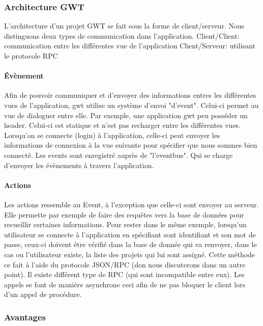 \subsubsection{Architecture GWT}
L'architecture d'un projet GWT se fait sous la forme de client/serveur. Nous distinguons deux types de communication dans l'application.
Client/Client: communication entre les différentes vue de l'application
Client/Serveur: utilisant le protocole RPC 

\paragraph{Évènement}
Afin de pouvoir communiquer et d'envoyer des informations entres les différentes vues de l'application, gwt utilise un système d'envoi "d'event". Celui-ci permet au vue de dialoguer entre elle.
Par exemple, une application gwt peu posséder un header. Celui-ci est statique et n'est pas recharger entre les différentes vues. Lorsqu'on se connecte (login) à l'application, celle-ci peut envoyer les informations de connexion à la vue suivante pour spécifier que nous sommes bien connecté.
Les events sont enregistré auprès de "l'eventbus". Qui se charge d'envoyer les évènements à travers l'application.

\paragraph{Actions}
Les actions ressemble au Event, à l'exception que celle-ci sont envoyer au serveur. Elle permette par exemple de faire des requêtes vers la base de données pour recueillir certaines informations. Pour rester dans le même exemple, lorsqu'un utilisateur se connecte à l'application en spécifiant sont identifiant et son mot de passe, ceux-ci doivent être vérifié dans la base de donnée qui va renvoyer, dans le cas ou l'utilisateur existe, la liste des projets qui lui sont assigné. Cette méthode ce fait à l'aide du protocole JSON/RPC (don nous discuterons dans un autre point). Il existe différent type de RPC (qui sont incompatible entre eux). Les appels se font de manière asynchrone ceci afin de ne pas bloquer le client lors d'un appel de procédure.
	
\subsubsection{Avantages}

